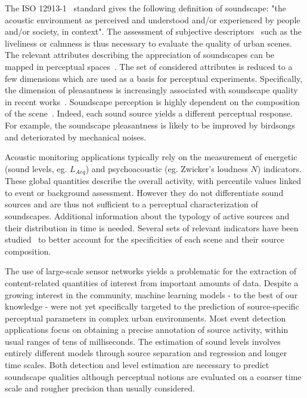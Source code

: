 \documentclass{article}
\begin{document}
\begin{sloppy}
The ISO 12913-1~\cite{iso2014} standard gives the following definition of soundscape: "the acoustic environment as perceived and understood and/or experienced by people and/or society, in context". The assessment of subjective descriptors~\cite{berglund2006, brown2011, aletta2016} such as the liveliness or calmness is thus necessary to evaluate the quality of urban scenes. The relevant attributes describing the appreciation of soundscapes can be mapped in perceptual spaces~\cite{axelsson2010, cain2013}. The set of considered attributes is reduced to a few dimensions which are used as a basis for perceptual experiments. Specifically, the dimension of pleasantness is increasingly associated with soundscape quality in recent works~\cite{decoensel2006, delaitre2014, ricciardi2014, aumond2017}. Soundscape perception is highly dependent on the composition of the scene~\cite{lavandier2006, nilsson2006}. Indeed, each sound source yields a different perceptual response. For example, the soundscape pleasantness is likely to be improved by birdsongs and deteriorated by mechanical noises.

Acoustic monitoring applications typically rely on the measurement of energetic (sound levels, eg. $L_{Aeq}$) and psychoacoustic (eg. Zwicker's loudness $N$) indicators. These global quantities describe the overall activity, with percentile values linked to event or background assessment. However they do not differentiate sound sources and are thus not sufficient to a perceptual characterization of soundscapes. Additional information about the typology of active sources and their distribution in time is needed. Several sets of relevant indicators have been studied~\cite{can2008, can2016, brocolini2013} to better account for the specificities of each scene and their source composition.

The use of large-scale sensor networks yields a problematic for the extraction of content-related quantities of interest from important amounts of data. Despite a growing interest in the community, machine learning models - to the best of our knowledge - were not yet specifically targeted to the prediction of source-specific perceptual parameters in complex urban environments. Most event detection applications focus on obtaining a precise annotation of source activity, within usual ranges of tens of milliseconds. The estimation of sound levels involves entirely different models through source separation and regression \cite{gloaguen2016} and longer time scales. Both detection and level estimation are necessary to predict soundscape qualities although perceptual notions are evaluated on a coarser time scale and rougher precision than usually considered.


\end{sloppy}
\end{document}
